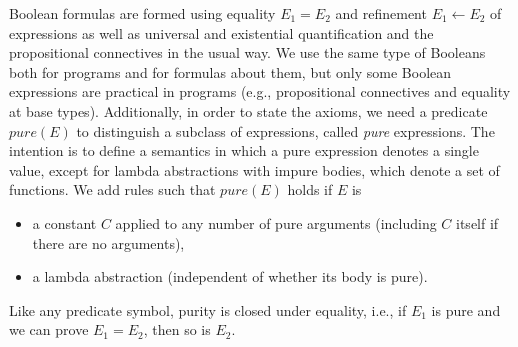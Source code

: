 \documentclass{llncs}
\newcommand{\Conid}[1]{\mathit{#1}}
\begin{document}
\def\pure#1{\mathit{pure}(#1)}
Boolean formulas are formed using equality \ensuremath{\Conid{E}_{1}\mathrel{=}\Conid{E}_{2}} and refinement \ensuremath{\Conid{E}_{1}\leftarrow\Conid{E}_{2}} of expressions 
as well as universal and existential quantification and the propositional connectives in the 
usual way.
We use the same type of Booleans both for programs and for formulas about them, but only some Boolean expressions are practical in programs (e.g.,  propositional connectives and equality at base types).
Additionally, in order to state the axioms, we need a predicate $\pure{E}$ to 
distinguish a subclass of expressions, called \emph{pure} expressions. The intention is to 
define a semantics in which a pure expression denotes a single value, except for lambda 
abstractions with impure bodies, which denote a set of functions.
We add rules such that $\pure{E}$ holds if \ensuremath{\Conid{E}} is
\begin{itemize}
\item a constant \ensuremath{\Conid{C}} applied to any number of pure arguments (including \ensuremath{\Conid{C}} itself if 
there are no arguments),
\item a lambda abstraction (independent of whether its body is pure).
\end{itemize} 
Like any predicate symbol, purity is closed under equality, i.e., if \ensuremath{\Conid{E}_{1}} is pure and we can prove \ensuremath{\Conid{E}_{1}\mathrel{=}\Conid{E}_{2}}, then so is \ensuremath{\Conid{E}_{2}}.
\end{document}
